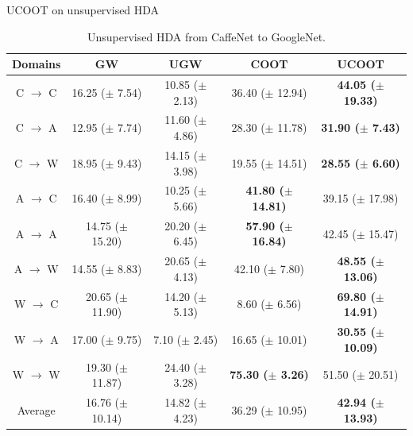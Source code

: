 \documentclass{beamer}
\begin{document}
\begin{frame}{UCOOT on unsupervised HDA}
\begin{table}[t]
  \centering
  \scriptsize
		\begin{tabular}{c c c c c}
				\toprule
				Domains & GW & UGW & COOT & UCOOT \\
				\midrule

				C $\to$ C & 16.25 ($\pm$ 7.54) & 10.85 ($\pm$ 2.13) & 36.40 ($\pm$ 12.94) & \textbf{44.05 ($\pm$ 19.33)} \\
				\hline
				C $\to$ A & 12.95 ($\pm$ 7.74) & 11.60 ($\pm$ 4.86) & 28.30 ($\pm$ 11.78) & \textbf{31.90 ($\pm$ 7.43)} \\
				\hline
				C $\to$ W & 18.95 ($\pm$ 9.43) & 14.15 ($\pm$ 3.98) & 19.55 ($\pm$ 14.51) & \textbf{28.55 ($\pm$ 6.60)} \\
				\hline

				A $\to$ C & 16.40 ($\pm$ 8.99) & 10.25 ($\pm$ 5.66) & \textbf{41.80 ($\pm$ 14.81)} & 39.15 ($\pm$ 17.98) \\
				\hline
				A $\to$ A & 14.75 ($\pm$ 15.20) & 20.20 ($\pm$ 6.45) & \textbf{57.90 ($\pm$ 16.84)} & 42.45 ($\pm$ 15.47) \\
				\hline
				A $\to$ W & 14.55 ($\pm$ 8.83) & 20.65 ($\pm$ 4.13) & 42.10 ($\pm$ 7.80) & \textbf{48.55 ($\pm$ 13.06)} \\
				\hline

				W $\to$ C & 20.65 ($\pm$ 11.90) & 14.20 ($\pm$ 5.13) & 8.60 ($\pm$ 6.56) & \textbf{69.80 ($\pm$ 14.91)} \\
				\hline
				W $\to$ A & 17.00 ($\pm$ 9.75) & 7.10 ($\pm$ 2.45) & 16.65 ($\pm$ 10.01) & \textbf{30.55 ($\pm$ 10.09)} \\
				\hline
				W $\to$ W & 19.30 ($\pm$ 11.87) & 24.40 ($\pm$ 3.28) & \textbf{75.30 ($\pm$ 3.26)} & 51.50 ($\pm$ 20.51) \\
				\bottomrule
				Average & 16.76 ($\pm$ 10.14) & 14.82 ($\pm$ 4.23) & 36.29 ($\pm$ 10.95) & \textbf{42.94 ($\pm$ 13.93)} \\
				\bottomrule
			\end{tabular}
	\caption*{\scriptsize{Unsupervised HDA from CaffeNet to GoogleNet}.}
\end{table}
\end{frame}
\end{document}

